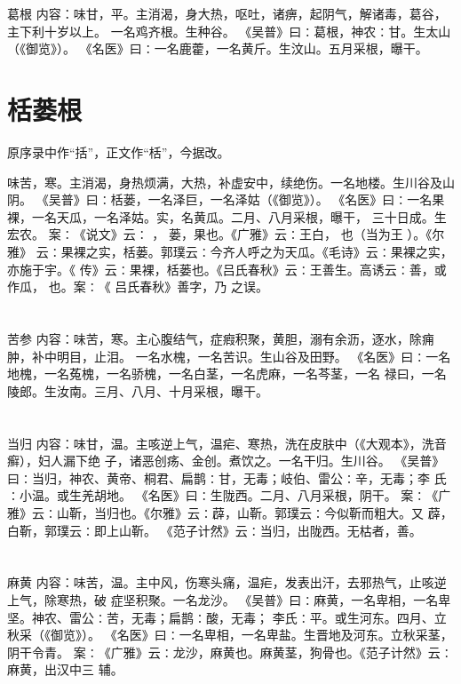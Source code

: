 \documentclass[12pt,UTF8]{ctexbook}
\begin{document}
\section{}葛根
内容：味甘，平。主消渴，身大热，呕吐，诸痹，起阴气，解诸毒，葛谷，主下利十岁以上。 
一名鸡齐根。生种谷。 
《吴普》曰∶葛根，神农∶甘。生太山（《御览》）。 
《名医》曰∶一名鹿藿，一名黄斤。生汶山。五月采根，曝干。 


\section{栝蒌根}

原序录中作“括”，正文作“栝”，今据改。

味苦，寒。主消渴，身热烦满，大热，补虚安中，续绝伤。一名地楼。生川谷及山阴。 
《吴普》曰∶栝蒌，一名泽巨，一名泽姑（《御览》）。 
《名医》曰∶一名果裸，一名天瓜，一名泽姑。实，名黄瓜。二月、八月采根，曝干， 
三十日成。生宏农。 
案∶《说文》云∶ ， 蒌，果也。《广雅》云∶王白， 也（当为王 ）。《尔雅》 
云∶果裸之实，栝蒌。郭璞云∶今齐人呼之为天瓜。《毛诗》云∶果裸之实，亦施于宇。《 
传》云∶果裸，栝蒌也。《吕氏春秋》云∶王善生。高诱云∶善，或作瓜， 也。案∶《 
吕氏春秋》善字，乃 之误。 


\section{}苦参
内容：味苦，寒。主心腹结气，症瘕积聚，黄胆，溺有余沥，逐水，除痈肿，补中明目，止泪。 
一名水槐，一名苦识。生山谷及田野。 
《名医》曰∶一名地槐，一名菟槐，一名骄槐，一名白茎，一名虎麻，一名芩茎，一名 
禄曰，一名陵郎。生汝南。三月、八月、十月采根，曝干。 


\section{}当归
内容：味甘，温。主咳逆上气，温疟、寒热，洗在皮肤中（《大观本》，洗音癣），妇人漏下绝 
子，诸恶创疡、金创。煮饮之。一名干归。生川谷。 
《吴普》曰∶当归，神农、黄帝、桐君、扁鹊∶甘，无毒；岐伯、雷公∶辛，无毒；李 
氏∶小温。或生羌胡地。 
《名医》曰∶生陇西。二月、八月采根，阴干。 
案∶《广雅》云∶山靳，当归也。《尔雅》云∶薜，山靳。郭璞云∶今似靳而粗大。又 
薜，白靳，郭璞云∶即上山靳。 
《范子计然》云∶当归，出陇西。无枯者，善。 


\section{}麻黄
内容：味苦，温。主中风，伤寒头痛，温疟，发表出汗，去邪热气，止咳逆上气，除寒热，破 
症坚积聚。一名龙沙。 
《吴普》曰∶麻黄，一名卑相，一名卑坚。神农、雷公∶苦，无毒；扁鹊∶酸，无毒； 
李氏∶平。或生河东。四月、立秋采（《御览》）。 
《名医》曰∶一名卑相，一名卑盐。生晋地及河东。立秋采茎，阴干令青。 
案∶《广雅》云∶龙沙，麻黄也。麻黄茎，狗骨也。《范子计然》云∶麻黄，出汉中三 
辅。 
\end{document}
